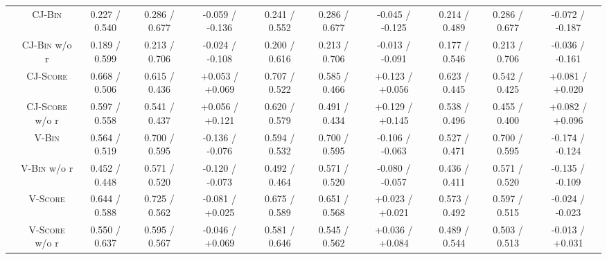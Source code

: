 \begin{table}[!t]
\begin{tabular}{@{}c|c|ccc|ccc|ccc@{}}
        \cmidrule{2-11}
                    & \textsc{CJ-Bin}          & 0.227 / 0.540    & 0.286 / 0.677    & -0.059 / -0.136                              & 0.241 / 0.552    & 0.286 / 0.677    & -0.045 / -0.125                              & 0.214 / 0.489    & 0.286 / 0.677    & -0.072 / -0.187                              \\
                    & \textsc{CJ-Bin} w/o r    & 0.189 / 0.599    & 0.213 / 0.706    & -0.024 / -0.108                              & 0.200 / 0.616    & 0.213 / 0.706    & -0.013 / -0.091                              & 0.177 / 0.546    & 0.213 / 0.706    & -0.036 / -0.161                              \\
                    & \textsc{CJ-Score}        & 0.668 / 0.506    & 0.615 / 0.436    & +0.053 / +0.069                              & 0.707 / 0.522    & 0.585 / 0.466    & +0.123 / +0.056                              & 0.623 / 0.445    & 0.542 / 0.425    & +0.081 / +0.020                              \\
                    & \textsc{CJ-Score} w/o r  & 0.597 / 0.558    & 0.541 / 0.437    & +0.056 / +0.121                              & 0.620 / 0.579    & 0.491 / 0.434    & +0.129 / +0.145                              & 0.538 / 0.496    & 0.455 / 0.400    & +0.082 / +0.096                              \\
        \cmidrule{2-11}
                    & \textsc{V-Bin}           & 0.564 / 0.519    & 0.700 / 0.595    & -0.136 / -0.076                              & 0.594 / 0.532    & 0.700 / 0.595    & -0.106 / -0.063                              & 0.527 / 0.471    & 0.700 / 0.595    & -0.174 / -0.124                              \\
                    & \textsc{V-Bin} w/o r     & 0.452 / 0.448    & 0.571 / 0.520    & -0.120 / -0.073                              & 0.492 / 0.464    & 0.571 / 0.520    & -0.080 / -0.057                              & 0.436 / 0.411    & 0.571 / 0.520    & -0.135 / -0.109                              \\
                    & \textsc{V-Score}         & 0.644 / 0.588    & 0.725 / 0.562    & -0.081 / +0.025                              & 0.675 / 0.589    & 0.651 / 0.568    & +0.023 / +0.021                              & 0.573 / 0.492    & 0.597 / 0.515    & -0.024 / -0.023                              \\
                    & \textsc{V-Score} w/o r   & 0.550 / 0.637    & 0.595 / 0.567    & -0.046 / +0.069                              & 0.581 / 0.646    & 0.545 / 0.562    & +0.036 / +0.084                              & 0.489 / 0.544    & 0.503 / 0.513    & -0.013 / +0.031                              \\

\end{tabular}
\end{table}
